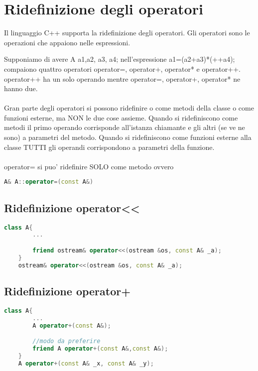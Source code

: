 \section{Ridefinizione degli operatori}
Il linguaggio C++ supporta la ridefinizione degli operatori. Gli operatori sono le operazioni che appaiono nelle espressioni.

Supponiamo di avere A a1,a2, a3, a4; nell’espressione
a1=(a2+a3)*(++a4); compaiono quattro operatori operator=,
operator+, operator* e operator++.
operator++ ha un solo operando mentre operator=, operator+,
operator* ne hanno due. 

\paragraph{}
Gran parte degli operatori si possono ridefinire o come metodi
della classe o come funzioni esterne, ma NON le due cose
assieme.
Quando si ridefiniscono come metodi il primo operando
corrisponde all’istanza chiamante e gli altri (se ve ne sono) a
parametri del metodo.
Quando si ridefiniscono come funzioni esterne alla classe TUTTI
gli operandi corrispondono a parametri della funzione. 
\paragraph{}
operator= si puo’ ridefinire SOLO come metodo ovvero

\begin{lstlisting}[language=c++]
    A& A::operator=(const A&)
\end{lstlisting}


\subsection{Ridefinizione operator<<}

\begin{lstlisting}[language=c++]
    class A{
        ...

        friend ostream& operator<<(ostream &os, const A& _a);
    }
    ostream& operator<<(ostream &os, const A& _a);
\end{lstlisting}

\subsection{Ridefinizione operator+}
\begin{lstlisting}[language=c++]
    class A{
        ...
        A operator+(const A&); 

        //modo da preferire
        friend A operator+(const A&,const A&);
    }
    A operator+(const A& _x, const A& _y);
\end{lstlisting}
